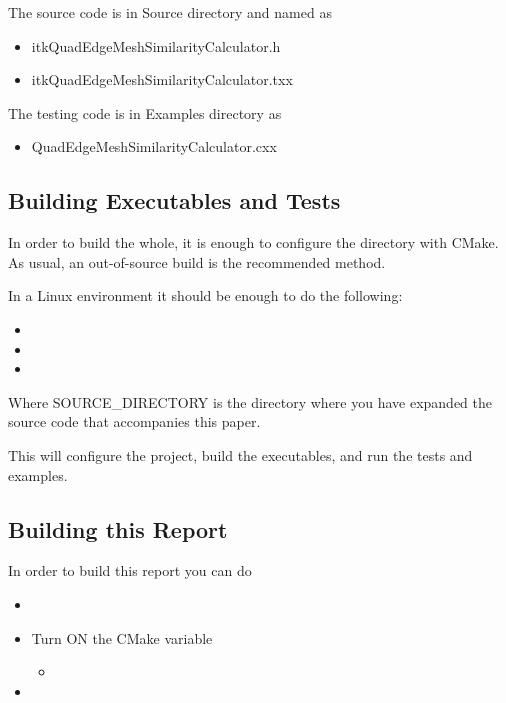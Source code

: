 \documentclass{InsightArticle}
\begin{document}
The source code is in Source directory and named as 

\begin{itemize}
\item itkQuadEdgeMeshSimilarityCalculator.h
\item itkQuadEdgeMeshSimilarityCalculator.txx
\end{itemize}


The testing code is in Examples directory as

\begin{itemize}
\item QuadEdgeMeshSimilarityCalculator.cxx
\end{itemize}

\subsection{Building Executables and Tests}

In order to build the whole, it is enough to configure the directory with
CMake. As usual, an out-of-source build is the recommended method.

In a Linux environment it should be enough to do the following:

\begin{itemize}
\item {}
\item {}
\item {}
\end{itemize}

Where SOURCE\_DIRECTORY is the directory where you have expanded the source
code that accompanies this paper.

This will configure the project, build the executables, and run the tests and
examples. 


\subsection{Building this Report}

In order to build this report you can do

\begin{itemize}
\item {}
\item Turn ON the CMake variable
\begin{itemize}
\item {}
\end{itemize}
\item {}
\end{itemize}
\end{document}
